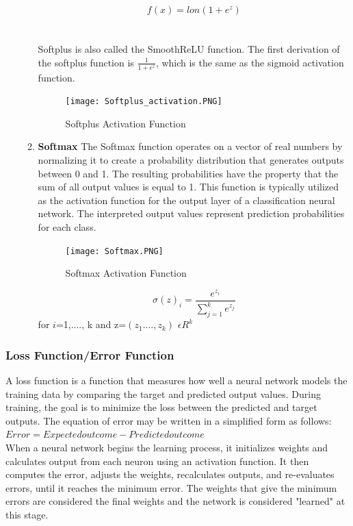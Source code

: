 \begin{itemize}
\begin{enumerate}
    $$f(x)=lon(1+e^{z})$$\\
    \\
    Softplus is also called the SmoothReLU function. The first derivation of the softplus function is  $\frac{1}{1+e^{z}}$, which is the same as the sigmoid activation function. 
    
    \begin{figure}[H]
        \centering\texttt{[image: Softplus\_activation.PNG]}
        \caption{Softplus Activation Function}
    \end{figure}
    \item \textbf{Softmax}
    The Softmax function operates on a vector of real numbers by normalizing it to create a probability distribution that generates outputs between 0 and 1. The resulting probabilities have the property that the sum of all output values is equal to 1. This function is typically utilized as the activation function for the output layer of a classification neural network. The interpreted output values represent prediction probabilities for each class.
    \begin{figure}[H]
        \centering\texttt{[image: Softmax.PNG]}
        \caption{Softmax Activation Function}
    \end{figure}
    $$\sigma(z)_{i}=\frac{e^{z_{i}}}{\sum_{j=1}^{k}e^{z_{j}}}$$ for \(i\)=1,...., k and z=$(z_{1}....,z_{k})$ $\epsilon R^{k}$
    \end{enumerate}
\end{itemize}

\subsubsection{Loss Function/Error Function}
A loss function is a function that measures how well a neural network models the training data by comparing the target and predicted output values. During training, the goal is to minimize the loss between the predicted and target outputs.
The equation of error may be written in a simplified form as follows:\\

\(Error = Expected outcome - Predicted outcome\)\\

When a neural network begins the learning process, it initializes weights and calculates output from each neuron using an activation function. It then computes the error, adjusts the weights, recalculates outputs, and re-evaluates errors, until it reaches the minimum error. The weights that give the minimum errors are considered the final weights and the network is considered "learned" at this stage.

